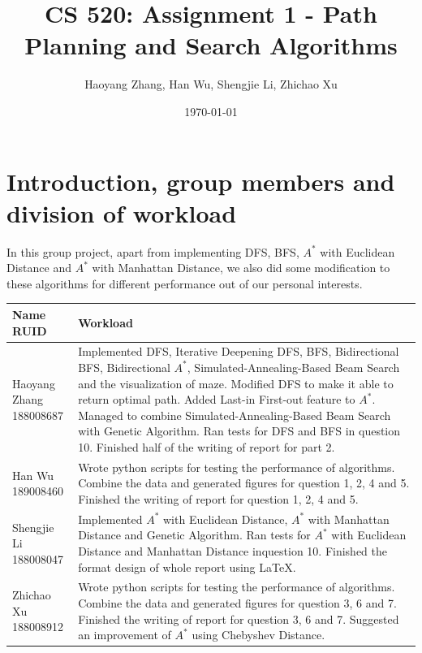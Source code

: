 \documentclass[letter]{article}
\title{CS 520: Assignment 1 - Path Planning and Search Algorithms}
\author{Haoyang Zhang, Han Wu, Shengjie Li, Zhichao Xu}
\date{\today}
\begin{document}
\maketitle

\section{Introduction, group members and division of workload}
\label{sec:Introduction}

In this group project, apart from implementing DFS, BFS, $ A^* $ with Euclidean Distance and $ A^* $ with Manhattan Distance, we also did some modification to these algorithms for different performance out of our personal interests.  \\
\begin{tabular}{| p{2.5cm} | p{11.5cm} |}
	\hline
	\makecell[c]{Name \\ RUID} & Workload \\
	\hline
	\makecell[c]{Haoyang Zhang \\ 188008687} & {Implemented DFS, Iterative Deepening DFS, BFS, Bidirectional BFS, Bidirectional $ A^* $, Simulated-Annealing-Based Beam Search and the visualization of maze. Modified DFS to make it able to return optimal path. Added Last-in First-out feature to $ A^* $. Managed to combine Simulated-Annealing-Based Beam Search with Genetic Algorithm. Ran tests for DFS and BFS in question 10. Finished half of the writing of report for part 2.} \\
	\hline
	\makecell[c]{Han Wu \\ 189008460} & {Wrote python scripts for testing the performance of algorithms. Combine the data and generated figures for question 1, 2, 4 and 5. Finished the writing of report for question 1, 2, 4 and 5.} \\
	\hline
	\makecell[c]{Shengjie Li \\ 188008047} & {Implemented $ A^* $ with Euclidean Distance, $ A^* $ with Manhattan Distance and Genetic Algorithm. Ran tests for $ A^* $ with Euclidean Distance and Manhattan Distance inquestion 10. Finished the format design of whole report using \LaTeX. } \\
	\hline
	\makecell[c]{Zhichao Xu \\ 188008912} & {Wrote python scripts for testing the performance of algorithms. Combine the data and generated figures for question 3, 6 and 7. Finished the writing of report for question 3, 6 and 7. Suggested an improvement of $ A^* $ using Chebyshev Distance.} \\
	\hline
\end{tabular}
\end{document}
